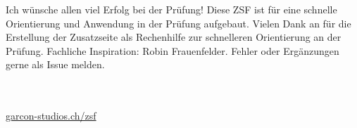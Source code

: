 \setcounter{zsfFirstChap}{1}

\begin{defbox}[][weight=quiet]
Ich wünsche allen viel Erfolg bei der Prüfung! Diese ZSF ist für eine schnelle Orientierung und Anwendung in der Prüfung aufgebaut. Vielen Dank an  für die Erstellung der Zusatzseite als Rechenhilfe zur schnelleren Orientierung an der Prüfung. Fachliche Inspiration: Robin Frauenfelder. Fehler oder Ergänzungen gerne als Issue melden.

\ZSFgap[S]
\\
\\
\href{https://garcon-studios.ch/zsf}{garcon-studios.ch/zsf}
\end{defbox}
